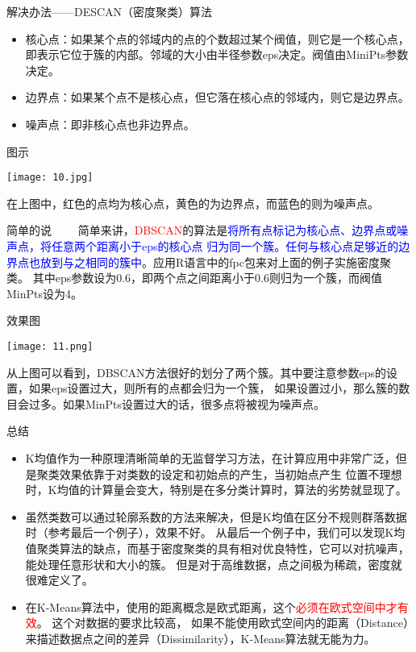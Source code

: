 \documentclass[cjk]{beamer}
\begin{document}
\begin{CJK*}{GBK}{kai}
\begin{frame}{解决办法——DESCAN（密度聚类）算法}
\begin{itemize}
  \item 核心点：如果某个点的邻域内的点的个数超过某个阀值，则它是一个核心点，
      即表示它位于簇的内部。邻域的大小由半径参数eps决定。阀值由MiniPts参数决定。
  \item 边界点：如果某个点不是核心点，但它落在核心点的邻域内，则它是边界点。
  \item 噪声点：即非核心点也非边界点。
\end{itemize}

\end{frame}


\begin{frame}{图示}
\begin{center}
  \texttt{[image: 10.jpg]}
  \end{center}
  在上图中，红色的点均为核心点，黄色的为边界点，而蓝色的则为噪声点。
\end{frame}

\begin{frame}{简单的说}
  \ \ \ \ 简单来讲，\textcolor{red}{DBSCAN}的算法是\textcolor{blue}{将所有点标记为核心点、边界点或噪声点，将任意两个距离小于eps的核心点
  归为同一个簇。任何与核心点足够近的边界点也放到与之相同的簇中}。应用R语言中的fpc包来对上面的例子实施密度聚类。
  其中eps参数设为0.6，即两个点之间距离小于0.6则归为一个簇，而阀值MinPts设为4。
\end{frame}

\begin{frame}{效果图}
\begin{center}
\texttt{[image: 11.png]}
\end{center}
从上图可以看到，DBSCAN方法很好的划分了两个簇。其中要注意参数eps的设置，如果eps设置过大，则所有的点都会归为一个簇，
如果设置过小，那么簇的数目会过多。如果MinPts设置过大的话，很多点将被视为噪声点。

\end{frame}

\begin{frame}{总结}
  \begin{itemize}
    \item K均值作为一种原理清晰简单的无监督学习方法，在计算应用中非常广泛，但是聚类效果依靠于对类数的设定和初始点的产生，当初始点产生
        位置不理想时，K均值的计算量会变大，特别是在多分类计算时，算法的劣势就显现了。
    \item  虽然类数可以通过轮廓系数的方法来解决，但是K均值在区分不规则群落数据时（参考最后一个例子），效果不好。 从最后一个例子中，我们可以发现K均值聚类算法的缺点，而基于密度聚类的具有相对优良特性，它可以对抗噪声，能处理任意形状和大小的簇。
        但是对于高维数据，点之间极为稀疏，密度就很难定义了。
    \item 在K-Means算法中，使用的距离概念是欧式距离，这个\textcolor{red}{必须在欧式空间中才有效}。
        这个对数据的要求比较高，
        如果不能使用欧式空间内的距离（Distance）来描述数据点之间的差异（Dissimilarity），K-Means算法就无能为力。
  \end{itemize}
\end{frame}


\end{CJK*}
\end{document}
